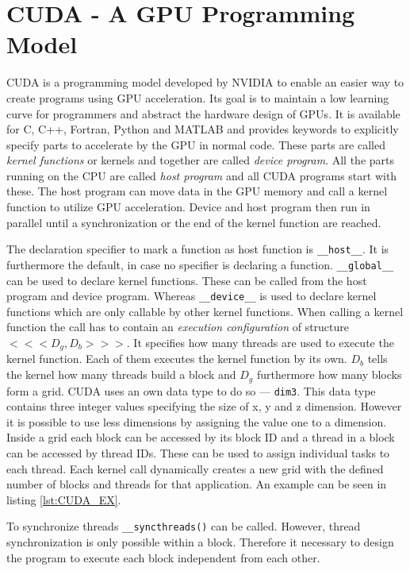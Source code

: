 \section{CUDA - A GPU Programming Model}
\label{sec:CUDA}
  CUDA is a programming model developed by NVIDIA to enable an easier way to create programs using GPU acceleration.
  Its goal is to maintain a low learning curve for programmers and abstract the hardware design of GPUs.
  It is available for C, C++, Fortran, Python and MATLAB and provides keywords to explicitly specify parts to accelerate by the GPU in normal code.
  These parts are called \textit{kernel functions} or kernels and together are called \textit{device program}.
  All the parts running on the CPU are called \textit{host program} and all CUDA programs start with these.
  The host program can move data in the GPU memory and call a kernel function to utilize GPU acceleration.
  Device and host program then run in parallel until a synchronization or the end of the kernel function are reached.~\cite{NVIDIA.2019}~\cite{Rauber.2012}~\cite{Huang.2008}

  The declaration specifier to mark a function as host function is \texttt{\_\_host\_\_}.
  It is furthermore the default, in case no specifier is declaring a function.
  \texttt{\_\_global\_\_} can be used to declare kernel functions.
  These can be called from the host program and device program.
  Whereas \texttt{\_\_device\_\_} is used to declare kernel functions which are only callable by other kernel functions.
  When calling a kernel function the call has to contain an \textit{execution configuration} of structure \(<<<D_{g}, D_{b}>>>\).
  It specifies how many threads are used to execute the kernel function.
  Each of them executes the kernel function by its own.
  \(D_b\) tells the kernel how many threads build a block and \(D_g\) furthermore how many blocks form a grid.
  CUDA uses an own data type to do so --- \texttt{dim3}.
  This data type contains three integer values specifying the size of x, y and z dimension.
  However it is possible to use less dimensions by assigning the value one to a dimension.
  Inside a grid each block can be accessed by its block ID and a thread in a block can be accessed by thread IDs.
  These can be used to assign individual tasks to each thread.
  Each kernel call dynamically creates a new grid with the defined number of blocks and threads for that application.
  An example can be seen in listing \ref{lst:CUDA_EX}.%

  To synchronize threads \texttt{\_\_syncthreads()} can be called.
  However, thread synchronization is only possible within a block.
  Therefore it necessary to design the program to execute each block independent from each other.%

